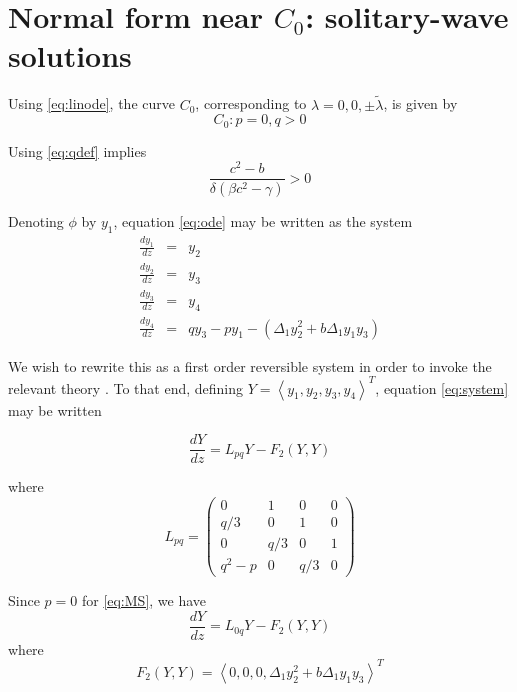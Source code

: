 \section{Normal form near $C_0$: solitary-wave solutions}

Using \eqref{eq:linode}, the curve $C_0$, corresponding to $\lambda = 0,0,\pm \tilde{ \lambda } $, is given by
\begin{equation}
C_0: { p=0, q > 0 }
\end{equation}

Using \eqref{eq:qdef} implies
\begin{equation}
 \frac{c^2 - b}{\delta\left(\beta c^2 - \gamma\right)} > 0
\end{equation}

Denoting $\phi$ by $y_1$, equation \eqref{eq:ode} may be written as the system
\begin{subequations}\label{eq:system}
\begin{eqnarray}
\frac{d y_1 }{d z} &=& y_2 \\
\frac{d y_2 }{d z} &=& y_3 \\
\frac{d y_3 }{d z} &=& y_4 \\
\frac{d y_4 }{d z} &=& q y_3 - p y_1 - \left(\Delta_1 y_2^2 + b \Delta_1 y_1 y_3 \right)
\end{eqnarray}
\end{subequations}

We wish to rewrite this as a first order reversible system in order to invoke the relevant theory \cite{IA}. 
To that end, defining  $Y=\left<y_1,y_2,y_3,y_4\right>^T$, equation \eqref{eq:system} may be written 

\begin{equation}\label{eq:bilinear}
\frac{ dY }{ dz } = L_{pq} Y - F_2(Y,Y) \end{equation}

where 
\begin{equation}
L_{pq} = \left( 
\begin{array}{cccc}
0&1&0&0\\
q/3&0&1&0\\
0&q/3&0&1\\
q^2 - p &0&q/3&0 \end{array} \right) \end{equation}

Since $p=0$ for \eqref{eq:MS}, we have 
\begin{equation} \label{eq:bilinear2}
 \frac{ dY }{ dz } = L_{0q} Y - F_2(Y,Y) 
\end{equation}
where 
\begin{equation}\label{eq:nonlinear}
F_2(Y,Y) = \left<0,0,0,\Delta_1 y_2^2 + b \Delta_1 y_1 y_3 \right>^T
\end{equation}

